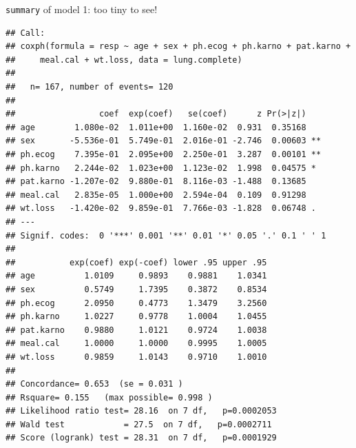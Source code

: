\begin{frame}[fragile]{\texttt{summary} of model 1: too tiny to see!}

{\tiny  
 
\begin{knitrout}
\color{fgcolor}\begin{kframe}
\begin{alltt}
\end{alltt}
\begin{verbatim}
## Call:
## coxph(formula = resp ~ age + sex + ph.ecog + ph.karno + pat.karno + 
##     meal.cal + wt.loss, data = lung.complete)
## 
##   n= 167, number of events= 120 
## 
##                 coef  exp(coef)   se(coef)      z Pr(>|z|)   
## age        1.080e-02  1.011e+00  1.160e-02  0.931  0.35168   
## sex       -5.536e-01  5.749e-01  2.016e-01 -2.746  0.00603 **
## ph.ecog    7.395e-01  2.095e+00  2.250e-01  3.287  0.00101 **
## ph.karno   2.244e-02  1.023e+00  1.123e-02  1.998  0.04575 * 
## pat.karno -1.207e-02  9.880e-01  8.116e-03 -1.488  0.13685   
## meal.cal   2.835e-05  1.000e+00  2.594e-04  0.109  0.91298   
## wt.loss   -1.420e-02  9.859e-01  7.766e-03 -1.828  0.06748 . 
## ---
## Signif. codes:  0 '***' 0.001 '**' 0.01 '*' 0.05 '.' 0.1 ' ' 1
## 
##           exp(coef) exp(-coef) lower .95 upper .95
## age          1.0109     0.9893    0.9881    1.0341
## sex          0.5749     1.7395    0.3872    0.8534
## ph.ecog      2.0950     0.4773    1.3479    3.2560
## ph.karno     1.0227     0.9778    1.0004    1.0455
## pat.karno    0.9880     1.0121    0.9724    1.0038
## meal.cal     1.0000     1.0000    0.9995    1.0005
## wt.loss      0.9859     1.0143    0.9710    1.0010
## 
## Concordance= 0.653  (se = 0.031 )
## Rsquare= 0.155   (max possible= 0.998 )
## Likelihood ratio test= 28.16  on 7 df,   p=0.0002053
## Wald test            = 27.5  on 7 df,   p=0.0002711
## Score (logrank) test = 28.31  on 7 df,   p=0.0001929
\end{verbatim}
\end{kframe}
\end{knitrout}
}

\end{frame}

